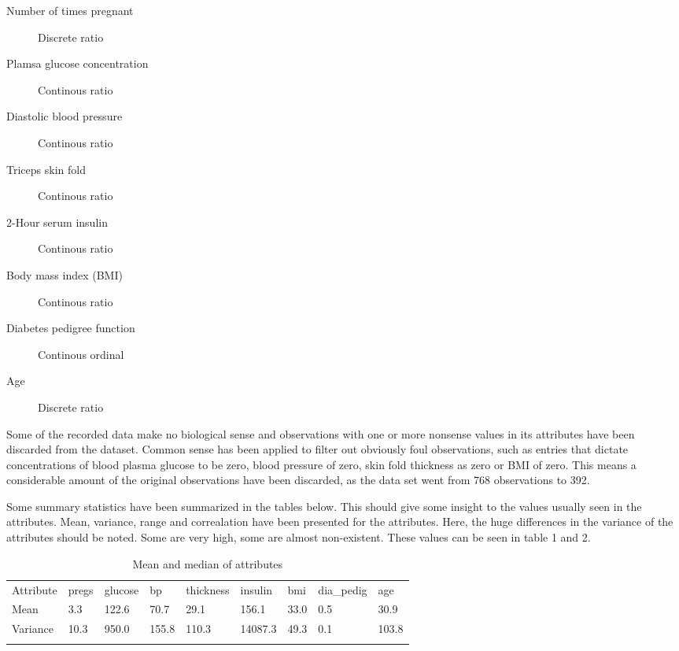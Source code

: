 \begin{description}
\item [Number of times pregnant] Discrete ratio
\item [Plamsa glucose concentration] Continous ratio
\item [Diastolic blood pressure] Continous ratio
\item [Triceps skin fold] Continous ratio
\item [2-Hour serum insulin] Continous ratio
\item [Body mass index (BMI)] Continous ratio
\item [Diabetes pedigree function] Continous ordinal
\item [Age] Discrete ratio
\end{description}


Some of the recorded data make no biological sense and observations with one or
more nonsense values in its attributes have been discarded from the dataset.
Common sense has been applied to filter out obviously foul observations, such
as entries that dictate concentrations of blood plasma glucose to be zero, blood
pressure of zero, skin fold thickness as zero or BMI of zero. This means a
considerable amount of the original observations have been discarded, as the
data set went from 768 observations to 392.
\bigskip

Some summary statistics have been summarized in the tables below. This should
give some insight to the values usually seen in the attributes. Mean, variance, range
and correalation have been presented for the attributes. Here, the huge differences
in the variance of the attributes should be noted. Some are very high, some are
almost non-existent. These values can be seen in table 1 and 2.

\begin{table}[]
\centering
\caption{Mean and median of attributes}
\label{my-label}
\begin{tabular}{lllllllll}
\cline{1-1}
\multicolumn{1}{|l|}{Attribute} & pregs & glucose & bp   & thickness & insulin & bmi  & dia\_pedig & age  \\ \cline{1-1}
\multicolumn{1}{|l|}{Mean}      & 3.3   & 122.6   & 70.7 & 29.1      & 156.1   & 33.0 & 0.5        & 30.9 \\ \cline{1-1}
\multicolumn{1}{|l|}{Variance}  & 10.3     & 950.0     & 155.8   & 110.3        & 14087.3    & 49.3 & 0.1       & 103.8 \\ \cline{1-1}
                                                       &       &         &      &           &         &      &            &      \\ \hline
\end{tabular}
\end{table}


